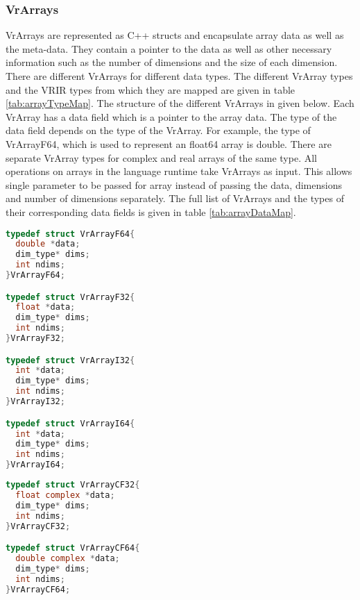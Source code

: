 \subsubsection{VrArrays}
\label{subsubsec:vrarrays}
VrArrays are represented as C++ structs and encapsulate array data as well as the meta-data. They contain a pointer to the data as well as other necessary information such as the number of dimensions and the size of each dimension. There are different VrArrays for different data types. The different VrArray types and the VRIR types from which they are mapped are given in table \ref{tab:arrayTypeMap}. The structure of the different VrArrays in given below. Each VrArray has a data field which is a pointer to the array data. The type of the data field depends on the type of the VrArray. For example, the type of VrArrayF64, which is used to represent an float64 array is double. 
There are separate VrArray types for complex and real arrays of the same type. All operations on arrays in the language runtime take VrArrays as input. This allows single parameter to be passed for array instead of passing the data, dimensions and number of dimensions separately. The full list of VrArrays and the types of their corresponding data fields is given in table \ref{tab:arrayDataMap}.
\begin{lstlisting}[float,language=c, label={vrArrayF64Struct}, caption={Structures of VrArrays for real data}]
typedef struct VrArrayF64{
  double *data;
  dim_type* dims;  
  int ndims;
}VrArrayF64;

typedef struct VrArrayF32{
  float *data;
  dim_type* dims;  
  int ndims;
}VrArrayF32;

typedef struct VrArrayI32{
  int *data;
  dim_type* dims;  
  int ndims;
}VrArrayI32;

typedef struct VrArrayI64{
  int *data;
  dim_type* dims;  
  int ndims;
}VrArrayI64;

\end{lstlisting}

\begin{lstlisting}[float,language=c, label={vrArrayF64Struct}, caption={Structures of VrArrays for complex data}]
typedef struct VrArrayCF32{
  float complex *data;
  dim_type* dims;  
  int ndims;
}VrArrayCF32;

typedef struct VrArrayCF64{
  double complex *data;
  dim_type* dims;  
  int ndims;
}VrArrayCF64;
\end{lstlisting}

